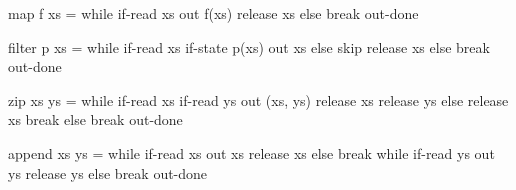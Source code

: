 \begin{code}
map f xs =
 while
    if-read xs
        out f(xs)
        release xs
    else
        break
 out-done

filter p xs =
 while
    if-read xs
        if-state p(xs)
            out xs
        else
            skip
        release xs
    else
        break
 out-done

zip xs ys =
 while
    if-read xs
        if-read ys
            out (xs, ys)
            release xs
            release ys
        else
            release xs
            break
    else
        break
 out-done

append xs ys =
 while
    if-read xs
        out xs
        release xs
    else
        break
 while
    if-read ys
        out ys
        release ys
    else
        break
 out-done
\end{code}
